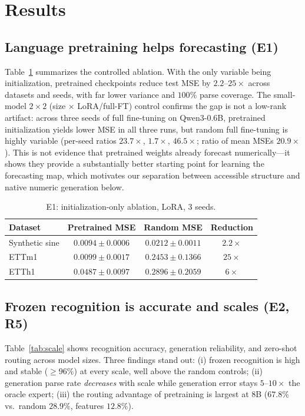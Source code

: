 \documentclass{article}
\begin{document}
\section{Results}\label{sec:results}

\subsection{Language pretraining helps forecasting (E1)}
Table~\ref{tab:e1} summarizes the controlled ablation.  With the only variable
being initialization, pretrained checkpoints reduce test MSE by $2.2$--$25\times$
across datasets and seeds, with far lower variance and $100\%$ parse coverage.
The small-model $2\times2$ (size $\times$ LoRA/full-FT) control confirms the
gap is not a low-rank artifact: across three seeds of full fine-tuning on
Qwen3-0.6B, pretrained initialization yields lower MSE in all three runs, but
random full fine-tuning is highly variable (per-seed ratios $23.7\times$,
$1.7\times$, $46.5\times$; ratio of mean MSEs $20.9\times$).  This is not
evidence that pretrained weights already forecast numerically---it shows they
provide a substantially better starting point for learning the forecasting
map, which motivates our separation between accessible structure and native
numeric generation below.

\begin{table}[t]
\centering
\small
\begin{tabular}{lccc}
\toprule
Dataset & Pretrained MSE & Random MSE & Reduction \\
\midrule
Synthetic sine & $0.0094\pm0.0006$ & $0.0212\pm0.0011$ & $2.2\times$ \\
ETTm1 & $0.0099\pm0.0017$ & $0.2453\pm0.1366$ & $25\times$ \\
ETTh1 & $0.0487\pm0.0097$ & $0.2896\pm0.2059$ & $6\times$ \\
\bottomrule
\end{tabular}
\caption{E1: initialization-only ablation, LoRA, 3 seeds.}
\label{tab:e1}
\end{table}

\subsection{Frozen recognition is accurate and scales (E2, R5)}
Table~\ref{tab:scale} shows recognition accuracy, generation reliability, and
zero-shot routing across model sizes.  Three findings stand out:
(i) frozen recognition is high and stable ($\geq96\%$) at every scale, well
above the random controls; (ii) generation parse rate \emph{decreases} with
scale while generation error stays $5$--$10\times$ the oracle expert; (iii)
the routing advantage of pretraining is largest at $8$B ($67.8\%$ vs.\ random
$28.9\%$, features $12.8\%$).
\end{document}

